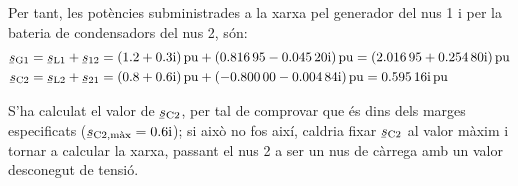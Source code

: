 \begin{exemple}
    Per tant, les potències subministrades a la xarxa pel generador del
    nus 1 i per la bateria de condensadors del nus 2, són:
    \begin{align*}
     \cmplx{s}\ped{G1} &= \cmplx{s}\ped{L1} + \cmplx{s}_{12} = \complexqty{1,2+j0,3}{pu} + \complexqty{0,81695 - j 0,04520}{pu} =
     \complexqty{2,01695 + j 0,25480}{pu} \\
     \cmplx{s}\ped{C2} &= \cmplx{s}\ped{L2} + \cmplx{s}_{21} = \complexqty{0,8+j0,6}{pu} + \complexqty{-0,80000 - j 0,00484}{pu} =
     \complexqty{  j 0,59516}{pu}
    \end{align*}

    S'ha calculat el valor de $\cmplx{s}\ped{C2}$, per tal de comprovar
    que és dins dels marges especificats
    ($\cmplx{s}\ped{C2,\text{màx}}=\complexnum{j0,6}$); si això no fos així,
    caldria fixar $\cmplx{s}\ped{C2}$ al  valor màxim i tornar a
    calcular la xarxa, passant el nus 2 a ser un nus de càrrega amb
    un valor  desconegut de tensió.
\end{exemple}

